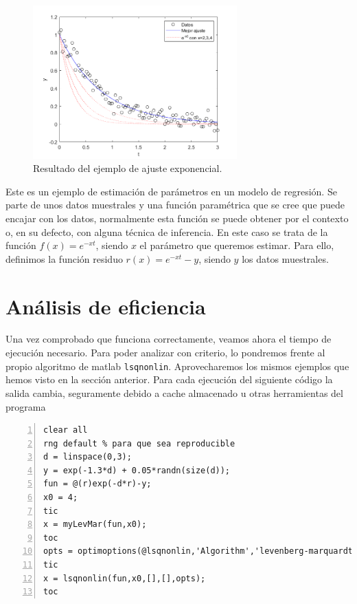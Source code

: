 \documentclass[11pt,a4paper]{book}
\theoremstyle{definition}
\theoremstyle{remark}
\def\code#1{\texttt{#1}}
\begin{document}
\begin{figure}[!ht]
	\centering
	\includegraphics[width=0.7\textwidth]{imgs/exp.png}
	\caption{Resultado del ejemplo de ajuste exponencial.}
	\label{out:exp}
\end{figure}

Este es un ejemplo de estimación de parámetros en un modelo de regresión.
Se parte de unos datos muestrales y una función paramétrica que se cree que puede encajar con los datos, normalmente esta función se puede obtener por el contexto o, en su defecto, con alguna técnica de inferencia. En este caso se trata de la función $f(x)=e^{-xt}$, siendo $x$ el parámetro que queremos estimar. Para ello, definimos la función residuo $r(x)=e^{-xt}-y$, siendo $y$ los datos muestrales.

\section{Análisis de eficiencia}

Una vez comprobado que funciona correctamente, veamos ahora el tiempo de ejecución necesario. Para poder
analizar con criterio, lo pondremos frente al propio algoritmo de matlab \code{lsqnonlin}. Aprovecharemos los mismos ejemplos que hemos visto en la sección anterior. Para cada ejecución del siguiente código la salida cambia, seguramente debido a cache almacenado u otras herramientas del programa

\vspace{10pt}
\begin{lstlisting}[frame=single, numbers=left, style=Matlab-editor]
clear all
rng default % para que sea reproducible
d = linspace(0,3);
y = exp(-1.3*d) + 0.05*randn(size(d));
fun = @(r)exp(-d*r)-y;
x0 = 4;
tic
x = myLevMar(fun,x0);
toc
opts = optimoptions(@lsqnonlin,'Algorithm','levenberg-marquardt');
tic
x = lsqnonlin(fun,x0,[],[],opts);
toc
\end{lstlisting}
\end{document}
